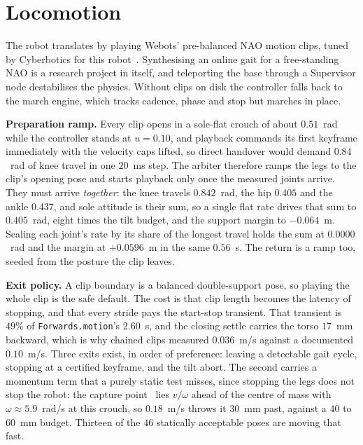 \documentclass[twocolumn]{article}
\begin{document}
\section{Locomotion}

The robot translates by playing Webots' pre-balanced NAO motion clips, tuned by Cyberbotics for
this robot~\cite{michel2004webots, gouaillier2009nao}. Synthesising an online gait for a
free-standing NAO is a research project in itself, and teleporting the base through a
Supervisor node destabilises the physics. Without clips on disk the controller falls back to
the march engine, which tracks cadence, phase and stop but marches in place.

\textbf{Preparation ramp.} Every clip opens in a sole-flat crouch of about $0.51$~rad while
the controller stands at $u = 0.10$, and playback commands its first keyframe immediately with
the velocity caps lifted, so direct handover would demand $0.84$~rad of knee travel in one
$20$~ms step. The arbiter therefore ramps the legs to the clip's opening pose and starts
playback only once the measured joints arrive. They must arrive \emph{together}: the knee
travels $0.842$~rad, the hip $0.405$ and the ankle $0.437$, and sole attitude is their sum, so
a single flat rate drives that sum to $0.405$~rad, eight times the tilt budget, and the
support margin to $-0.064$~m. Scaling each joint's rate by its share of the longest travel
holds the sum at $0.0000$~rad and the margin at $+0.0596$~m in the same $0.56$~s. The return is
a ramp too, seeded from the posture the clip leaves.

\textbf{Exit policy.} A clip boundary is a balanced double-support pose, so playing the whole
clip is the safe default. The cost is that clip length becomes the latency of stopping, and
that every stride pays the start-stop transient. That transient is $49\%$ of \texttt{Forwards.motion}'s
$2.60$~s, and the closing settle carries the torso $17$~mm backward, which is why chained clips
measured $0.036$~m/s against a documented $0.10$~m/s. Three exits exist, in order of
preference: leaving a detectable gait cycle, stopping at a certified keyframe, and the tilt
abort. The second carries a momentum term that a purely static test misses, since stopping the
legs does not stop the robot: the capture point~\cite{pratt2006capture} lies $v/\omega$ ahead
of the centre of mass with $\omega \approx 5.9$~rad/s at this crouch, so $0.18$~m/s throws it
$30$~mm past, against a $40$ to $60$~mm budget. Thirteen of the $46$ statically acceptable
poses are moving that fast.
\end{document}
